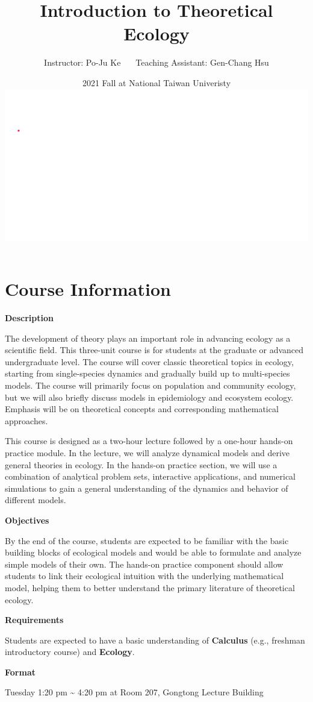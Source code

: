 \documentclass[
]{book}
\title{Introduction to Theoretical Ecology}
\author{Instructor: Po-Ju Ke \(~~~~~\) Teaching Assistant: Gen-Chang Hsu}
\date{2021 Fall at National Taiwan Univeristy \includegraphics{./bifurcation.gif}}
\begin{document}
\maketitle

{
\setcounter{tocdepth}{1}
\tableofcontents
}
\hypertarget{course-information}{%
\chapter*{Course Information}\label{course-information}}

\textbf{Description}

The development of theory plays an important role in advancing ecology as a scientific field. This three-unit course is for students at the graduate or advanced undergraduate level. The course will cover classic theoretical topics in ecology, starting from single-species dynamics and gradually build up to multi-species models. The course will primarily focus on population and community ecology, but we will also briefly discuss models in epidemiology and ecosystem ecology. Emphasis will be on theoretical concepts and corresponding mathematical approaches.

This course is designed as a two-hour lecture followed by a one-hour hands-on practice module. In the lecture, we will analyze dynamical models and derive general theories in ecology. In the hands-on practice section, we will use a combination of analytical problem sets, interactive applications, and numerical simulations to gain a general understanding of the dynamics and behavior of different models.

\textbf{Objectives}

By the end of the course, students are expected to be familiar with the basic building blocks of ecological models and would be able to formulate and analyze simple models of their own. The hands-on practice component should allow students to link their ecological intuition with the underlying mathematical model, helping them to better understand the primary literature of theoretical ecology.

\textbf{Requirements}

Students are expected to have a basic understanding of \textbf{Calculus} (e.g., freshman introductory course) and \textbf{Ecology}.

\textbf{Format}

Tuesday 1:20 pm \textasciitilde{} 4:20 pm at Room 207, Gongtong Lecture Building
\end{document}
